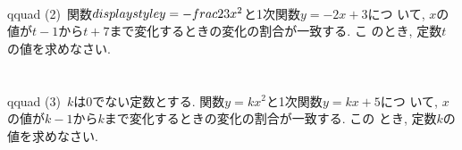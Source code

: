 \\qquad (2)~関数$\\displaystyle y=-\\frac{2}{3}x^{2}$と1次関数$y=-2x+3$につ
いて, $x$の値が$t-1$から$t+7$まで変化するときの変化の割合が一致する. こ
のとき, 定数$t$の値を求めなさい.
\\\\
\\qquad (3)~$k$は$0$でない定数とする. 関数$y=kx^{2}$と1次関数$y=kx+5$につ
いて, $x$の値が$k-1$から$k$まで変化するときの変化の割合が一致する. この
とき, 定数$k$の値を求めなさい.

